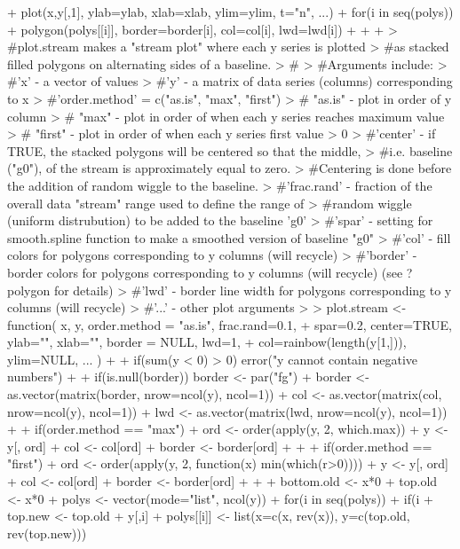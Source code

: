 \documentclass[11pt]{article}
\begin{document}
\begin{Schunk}
\begin{Sinput}
{{{+     plot(x,y[,1], ylab=ylab, xlab=xlab, ylim=ylim, t="n", ...)
+     for(i in seq(polys)){
+         polygon(polys[[i]], border=border[i], col=col[i], lwd=lwd[i])
+     }
+     
+ }
> #plot.stream makes a "stream plot" where each y series is plotted
> #as stacked filled polygons on alternating sides of a baseline.
> #
> #Arguments include:
> #'x' - a vector of values
> #'y' - a matrix of data series (columns) corresponding to x
> #'order.method' = c("as.is", "max", "first")
> # "as.is" - plot in order of y column
> # "max" - plot in order of when each y series reaches maximum value
> # "first" - plot in order of when each y series first value > 0
> #'center' - if TRUE, the stacked polygons will be centered so that the middle,
> #i.e. baseline ("g0"), of the stream is approximately equal to zero.
> #Centering is done before the addition of random wiggle to the baseline.
> #'frac.rand' - fraction of the overall data "stream" range used to define the range of
> #random wiggle (uniform distrubution) to be added to the baseline 'g0'
> #'spar' - setting for smooth.spline function to make a smoothed version of baseline "g0"
> #'col' - fill colors for polygons corresponding to y columns (will recycle)
> #'border' - border colors for polygons corresponding to y columns (will recycle) (see ?polygon for details)
> #'lwd' - border line width for polygons corresponding to y columns (will recycle)
> #'...' - other plot arguments
>  
> plot.stream <- function( x, y, order.method = "as.is", frac.rand=0.1,
+                         spar=0.2, center=TRUE, ylab="", xlab="", border = NULL, lwd=1,
+                         col=rainbow(length(y[1,])), ylim=NULL, ...  ){
+     
+     if(sum(y < 0) > 0) error("y cannot contain negative numbers")
+     
+     if(is.null(border)) border <- par("fg")
+     border <- as.vector(matrix(border, nrow=ncol(y), ncol=1))
+     col <- as.vector(matrix(col, nrow=ncol(y), ncol=1))
+     lwd <- as.vector(matrix(lwd, nrow=ncol(y), ncol=1))
+     
+     if(order.method == "max") {
+         ord <- order(apply(y, 2, which.max))
+         y <- y[, ord]
+         col <- col[ord]
+         border <- border[ord]
+     }
+     
+     if(order.method == "first") {
+ 	ord <- order(apply(y, 2, function(x) min(which(r>0))))
+         y <- y[, ord]
+         col <- col[ord]
+         border <- border[ord]
+     }
+     
+     bottom.old <- x*0
+     top.old <- x*0
+     polys <- vector(mode="list", ncol(y))
+     for(i in seq(polys)){
+         if(i %% 2 == 1){ #if odd
+             top.new <- top.old + y[,i]
+             polys[[i]] <- list(x=c(x, rev(x)), y=c(top.old, rev(top.new)))
}}}}
\end{Sinput}
\end{Schunk}
\end{document}
